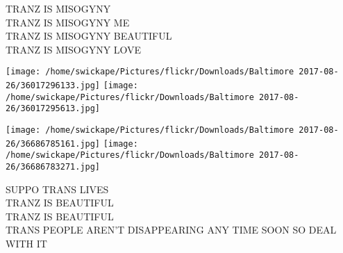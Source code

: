 \documentclass[10pt,letterpaper]{article}
\begin{document}
TRANZ IS MISOGYNY\\
TRANZ IS MISOGYNY ME\\
TRANZ IS MISOGYNY BEAUTIFUL\\
TRANZ IS MISOGYNY LOVE
\pagebreak

\texttt{[image: /home/swickape/Pictures/flickr/Downloads/Baltimore 2017-08-26/36017296133.jpg]}
\texttt{[image: /home/swickape/Pictures/flickr/Downloads/Baltimore 2017-08-26/36017295613.jpg]}

\texttt{[image: /home/swickape/Pictures/flickr/Downloads/Baltimore 2017-08-26/36686785161.jpg]}
\texttt{[image: /home/swickape/Pictures/flickr/Downloads/Baltimore 2017-08-26/36686783271.jpg]}

SUPPO TRANS LIVES\\
TRANZ IS BEAUTIFUL\\
TRANZ IS BEAUTIFUL\\
TRANS PEOPLE AREN'T DISAPPEARING ANY TIME SOON SO DEAL WITH IT
\pagebreak
\end{document}
